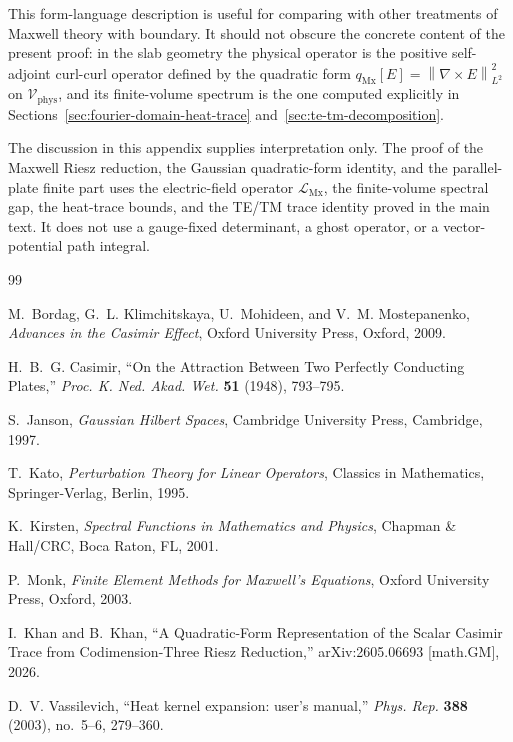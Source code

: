 \documentclass[11pt]{article}
\providecommand{\norm}[1]{\left\lVert #1\right\rVert}
\providecommand{\Vphys}{\mathcal V_{\mathrm{phys}}}
\providecommand{\qMx}{q_{\mathrm{Mx}}}
\providecommand{\LMx}{\mathcal L_{\mathrm{Mx}}}
\numberwithin{equation}{section}
\begin{document}
This form-language description is useful for comparing with other treatments
of Maxwell theory with boundary.  It should not obscure the concrete content
of the present proof: in the slab geometry the physical operator is the
positive self-adjoint curl-curl operator defined by the quadratic form
\(\qMx[E]=\norm{\nabla\times E}_{L^2}^2\) on
\(\Vphys\), and its finite-volume spectrum is the one computed explicitly in
Sections~\ref{sec:fourier-domain-heat-trace} and~\ref{sec:te-tm-decomposition}.

\begin{remark}
\label{rem:gauge-comment-no-additional-input}
The discussion in this appendix supplies interpretation only.  The proof of
the Maxwell Riesz reduction, the Gaussian quadratic-form identity, and the
parallel-plate finite part uses the electric-field operator \(\LMx\), the
finite-volume spectral gap, the heat-trace bounds, and the TE/TM trace identity
proved in the main text.  It does not use a gauge-fixed determinant, a ghost
operator, or a vector-potential path integral.
\end{remark}

\begin{thebibliography}{99}

M.~Bordag, G.~L. Klimchitskaya, U.~Mohideen, and V.~M. Mostepanenko,
\emph{Advances in the Casimir Effect},
Oxford University Press, Oxford, 2009.

H.~B.~G. Casimir,
``On the Attraction Between Two Perfectly Conducting Plates,''
\emph{Proc. K. Ned. Akad. Wet.} \textbf{51} (1948), 793--795.

S.~Janson,
\emph{Gaussian Hilbert Spaces},
Cambridge University Press, Cambridge, 1997.

T.~Kato,
\emph{Perturbation Theory for Linear Operators},
Classics in Mathematics, Springer-Verlag, Berlin, 1995.

K.~Kirsten,
\emph{Spectral Functions in Mathematics and Physics},
Chapman \& Hall/CRC, Boca Raton, FL, 2001.

P.~Monk,
\emph{Finite Element Methods for Maxwell's Equations},
Oxford University Press, Oxford, 2003.

I.~Khan and B.~Khan,
``A Quadratic-Form Representation of the Scalar Casimir Trace from
Codimension-Three Riesz Reduction,''
arXiv:2605.06693 [math.GM], 2026.

D.~V. Vassilevich,
``Heat kernel expansion: user's manual,''
\emph{Phys. Rep.} \textbf{388} (2003), no.~5--6, 279--360.

\end{thebibliography}
\end{document}
